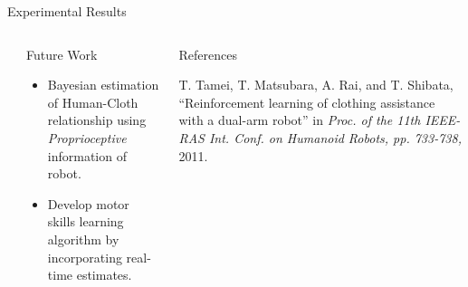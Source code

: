 \documentclass[final,hyperref={pdfpagelabels=false}]{beamer}
\begin{document}
\begin{frame}[t]
\begin{columns}[t]
\begin{column}{0.96\linewidth}
\begin{alertblock}{Experimental Results}
\begin{columns}[t]
\begin{column}{0.49\linewidth}
\begin{columns}[t]
\begin{column}{0.39\linewidth}
\end{column}

\end{columns}

\end{column}

\end{columns}

\end{alertblock}

\end{column}

\begin{column}{0.02\textwidth}\end{column}

\end{columns}

\begin{columns}[t]

\begin{column}{.02\textwidth}\end{column}

\begin{column}{0.47\textwidth}

\begin{block}{Future Work}

\begin{itemize}
\item Bayesian estimation of Human-Cloth relationship using \emph{Proprioceptive} information of robot.
\vspace{3mm}
\item Develop motor skills learning algorithm by incorporating real-time estimates.
\end{itemize}

\end{block}

\end{column}

\begin{column}{0.47\textwidth}

\begin{block}{References}

\nocite{*}
\scriptsize{


\begin{thebibliography}{10}
T. Tamei, T. Matsubara, A. Rai, and T. Shibata, ``Reinforcement learning of clothing assistance with a dual-arm robot'' in \emph{Proc. of the 11th IEEE-RAS Int. Conf. on Humanoid Robots, pp. 733-738,} 2011.


\end{thebibliography}}
\end{block}
\end{column}
\end{columns}
\end{frame}
\end{document}
